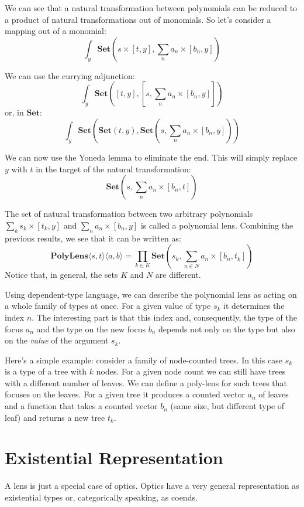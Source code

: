 \documentclass[11pt]{amsart}
\begin{document}
We can see that a natural transformation between polynomials can be reduced to a product of natural transformations out of monomials. So let's consider a mapping out of a monomial:
\[ \int_y \mathbf{Set} \left( s \times [t, y], \sum_n a_n \times [b_n, y]\right) \]
 
 We can use the currying adjunction:
\[ \int_y \mathbf{Set} \left( 
    [t, y],  \left[s, \sum_n a_n \times [b_n, y]\right]  \right) \]
 or, in $\mathbf{Set}$:
 \[ \int_y \mathbf{Set} \left( 
    \mathbf{Set}(t, y), \mathbf{Set} \left(s, \sum_n a_n \times [b_n, y]\right)  \right) \]

 We can now use the Yoneda lemma to eliminate the end. This will simply replace $y$ with $t$ in the target of the natural transformation:
 \[ \mathbf{Set}\left(s, \sum_n a_n \times [b_n, t] \right) \]
 
The set of natural transformation between two arbitrary polynomials $\sum_k s_k \times [t_k, y]$ and $\sum_n a_n \times [b_n, y]$ is called a polynomial lens. Combining the previous results, we see that it can be written as:
 \[ \mathbf{PolyLens}\langle s, t\rangle \langle a, b\rangle = \prod_{k \in K} \mathbf{Set}\left(s_k, \sum_{n \in N} a_n \times [b_n, t_k] \right) \]
Notice that, in general, the sets $K$ and $N$ are different. 

Using dependent-type language, we can describe the polynomial lens as acting on a whole family of types at once. For a given value of type $s_k$ it determines the index $n$. The interesting part is that this index and, consequently, the type of the focus $a_n$ and the type on the new focus $b_n$ depends not only on the type but also on the \emph{value} of the argument $s_k$. 

Here's a simple example: consider a family of node-counted trees. In this case $s_k$ is a type of a tree with $k$ nodes. For a given node count we can still have trees with a different number of leaves. We can define a poly-lens for such trees that focuses on the leaves. For a given tree it produces a counted vector $a_n$ of leaves and a function that takes a counted vector $b_n$  (same size, but different type of leaf) and returns a new tree $t_k$. 

\section{Existential Representation}


A lens is just a special case of optics. Optics have a very general representation as existential types or, categorically speaking, as coends. 
\end{document}
